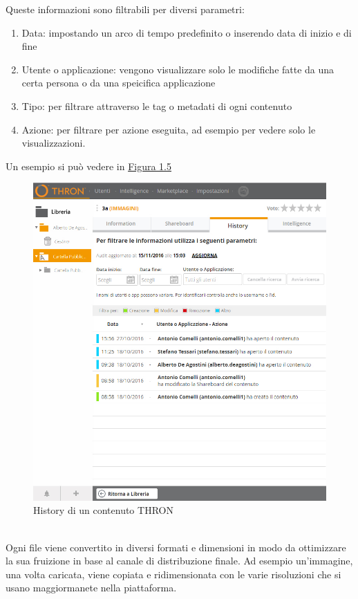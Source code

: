 \documentclass[a4paper, 12pt, twoside, openright]{book}
\begin{document}
Queste informazioni sono filtrabili per diversi parametri:
\begin{enumerate}
\item Data: impostando un arco di tempo predefinito o inserendo data di inizio e di fine
\item Utente o applicazione: vengono visualizzare solo le modifiche fatte da una certa persona o da una speicifica applicazione
\item Tipo: per filtrare attraverso le tag o metadati di ogni contenuto
\item Azione: per filtrare per azione eseguita, ad esempio per vedere solo le visualizzazioni.
\end{enumerate}
Un esempio si può vedere in \hyperref[content-history]{Figura 1.5}
\begin{figure}[h] %
	\centering
	\label{content-history}
	\includegraphics[width=1.0\textwidth]{images/content-history.jpg}
	\caption{History di un contenuto THRON}
\end{figure}
\\Ogni file viene convertito in diversi formati e dimensioni in modo da ottimizzare la sua fruizione in base al canale di distribuzione finale. Ad esempio un'immagine, una volta caricata, viene copiata e ridimensionata con le varie risoluzioni che si usano maggiormanete nella piattaforma.\\
\end{document}
